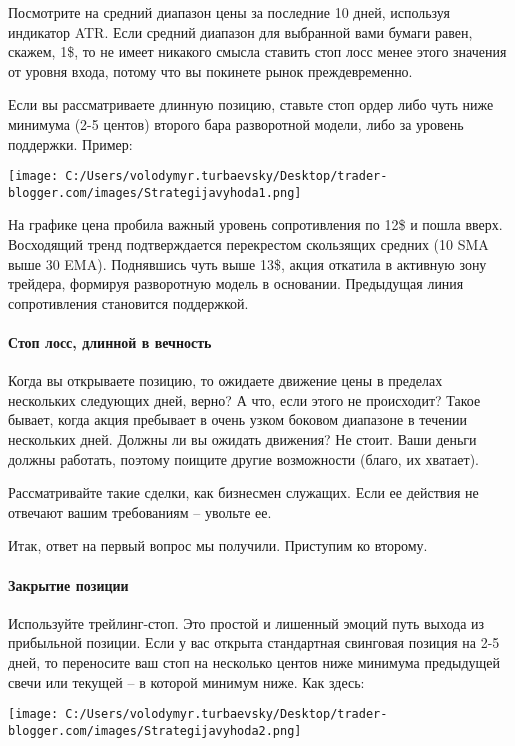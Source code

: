 \documentclass[a5paper]{article}
\begin{document}
Посмотрите на средний диапазон цены за последние 10 дней, используя индикатор ATR. Если средний диапазон для выбранной вами бумаги равен, скажем, 1\$, то не имеет никакого смысла ставить стоп лосс менее этого значения от уровня входа, потому что вы покинете рынок преждевременно.

Если вы рассматриваете длинную позицию, ставьте стоп ордер либо чуть
ниже минимума (2-5 центов) второго бара разворотной модели, либо за
уровень поддержки. Пример:

\texttt{[image: C:/Users/volodymyr.turbaevsky/Desktop/trader-blogger.com/images/Strategijavyhoda1.png]}

На графике цена пробила важный уровень сопротивления по 12\$ и пошла
вверх. Восходящий тренд подтверждается перекрестом скользящих средних
(10 SMA выше 30 EMA). Поднявшись чуть выше 13\$, акция откатила в
активную зону трейдера, формируя разворотную модель в
основании. Предыдущая линия сопротивления становится поддержкой.

\paragraph{Стоп лосс, длинной в вечность}

Когда вы открываете позицию, то ожидаете движение цены в пределах нескольких следующих дней, верно? А что, если этого не происходит? Такое бывает, когда акция пребывает в очень узком боковом диапазоне в течении нескольких дней. Должны ли вы ожидать движения? Не стоит. Ваши деньги должны работать, поэтому поищите другие возможности (благо, их хватает).

Рассматривайте такие сделки, как бизнесмен служащих. Если ее действия не отвечают вашим требованиям – увольте ее.

Итак, ответ на первый вопрос мы получили. Приступим ко второму.

\paragraph{Закрытие позиции}

Используйте трейлинг-стоп. Это простой и лишенный эмоций путь выхода
из прибыльной позиции. Если у вас открыта стандартная свинговая
позиция на 2-5 дней, то переносите ваш стоп на несколько центов ниже
минимума предыдущей свечи или текущей – в которой минимум ниже. Как
здесь:

\texttt{[image: C:/Users/volodymyr.turbaevsky/Desktop/trader-blogger.com/images/Strategijavyhoda2.png]}
\end{document}
